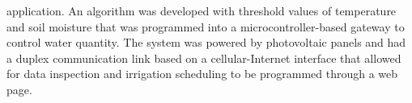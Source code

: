 \documentclass[conference]{IEEEtran}
\begin{document}
application. An algorithm was developed with threshold values of temperature and soil moisture that was programmed into a microcontroller-based gateway to control water quantity. The system was powered by photovoltaic panels and had a duplex communication link based on a cellular-Internet interface that allowed for data inspection and irrigation scheduling to be programmed through a web page\cite{c6}.
	
\end{document}
